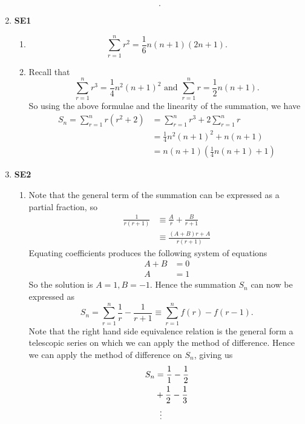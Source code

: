 \documentclass[12pt,oneside]{book}
\begin{document}
\begin{enumerate}
\[        .\] 
        \item \textbf{SE1} \begin{enumerate}
            \item \[
                \sum_{r=1}^{n} r^2 = \frac{1}{6} n (n + 1) (2n + 1)
            .\] 
            \item Recall that \[
                \sum_{r=1}^{n} r^3 = \frac{1}{4}n^2(n+1)^2 \text{ and } \sum_{r=1}^{n} r = \frac{1}{2}n(n+1) 
            .\] So using the above formulae and the linearity of the summation, we have \begin{align*}
                S_n = \sum_{r=1}^{n} r(r^2 + 2) &= \sum_{r=1}^{n} r^3 + 2 \sum_{r=1}^{n} r \\
                &= \frac{1}{4}n^2 (n + 1)^2 + n (n+1) \\
                &= n(n+1) \left( \frac{1}{4}n(n+1) + 1 \right)  
            \end{align*}
        \end{enumerate}
        \item \textbf{SE2} \begin{enumerate}
            \item Note that the general term of the summation can be expressed as a partial fraction, so \begin{align*}
                \frac{1}{r(r+1)} &\equiv \frac{A}{r} + \frac{B}{r+1} \\
                &\equiv \frac{(A + B)r + A}{r(r+1)}
            \end{align*}
            Equating coefficients produces the following system of equations \begin{align*}
                A + B &= 0 \\
                A &= 1
            \end{align*}
            So the solution is $A = 1, B = -1$. Hence the summation $S_n$ can now be expressed as \[
                S_n = \sum_{r=1}^{n} \frac{1}{r} - \frac{1}{r+1} \equiv \sum_{r=1}^{n} f(r) - f(r-1)
            .\] 
            Note that the right hand side equivalence relation is the general form a telescopic series on which we can apply the method of difference. Hence we can apply the method of difference on $S_n$, giving us \begin{align*}
                S_n &= \frac{1}{1} - \frac{1}{2} \\
                    &+ \frac{1}{2} - \frac{1}{3} \\
                    &\hspace{2mm}\vdots \\

\end{align*}
\end{enumerate}
\end{enumerate}
\end{document}
